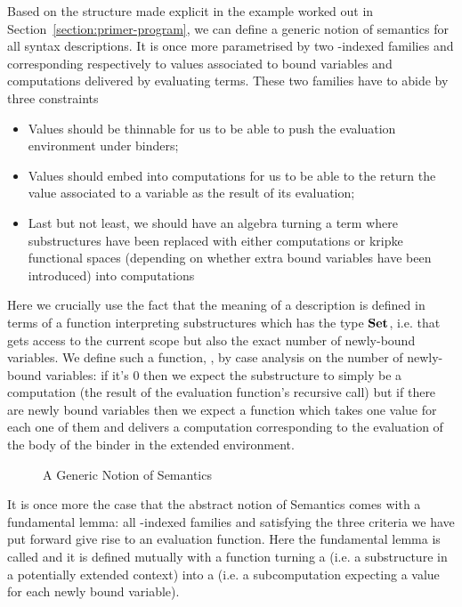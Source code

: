 Based on the structure made explicit in the example worked out
in Section~\ref{section:primer-program}, we can define a generic notion of
semantics for all syntax descriptions. It is once more parametrised
by two -indexed families  and  corresponding
respectively to values associated to bound variables and
computations delivered by evaluating terms. These two families
have to abide by three constraints
\begin{itemize}
\item Values should be thinnable for us to be able to push the
      evaluation environment under binders;
\item Values should embed into computations for us to be able
      to the return the value associated to a variable as the
      result of its evaluation;
\item Last but not least, we should have an algebra turning
      a term where substructures have been replaced with
      either computations or kripke functional spaces (depending
      on whether extra bound variables have been introduced)
      into computations
\end{itemize}
Here we crucially use the fact that the meaning of a description is
defined in terms of a function interpreting substructures which has
the type     $\mathbf{Set}{}$, i.e. that gets access
to the current scope but also the exact number of newly-bound variables.
We define such a function, , by case analysis on the number
of newly-bound variables: if it's $0$ then we expect the substructure
to simply be a computation (the result of the evaluation function's
recursive call) but if there are newly bound variables then we expect
a function which takes one value for each one of them and delivers
a computation corresponding to the evaluation of the body of the binder
in the extended environment.

\begin{figure}[h]
\begin{minipage}{0.45\textwidth}
\end{minipage}\hspace{2em}
\begin{minipage}{0.45\textwidth}
\end{minipage}
\caption{A Generic Notion of Semantics}
\end{figure}

It is once more the case that the abstract notion of Semantics comes
with a fundamental lemma: all -indexed families  and
 satisfying the three criteria we have put forward give rise
to an evaluation function. Here the fundamental lemma is called 
and it is defined mutually with a function  turning a 
(i.e. a substructure in a potentially extended context) into a 
(i.e. a subcomputation expecting a value for each newly bound variable).

